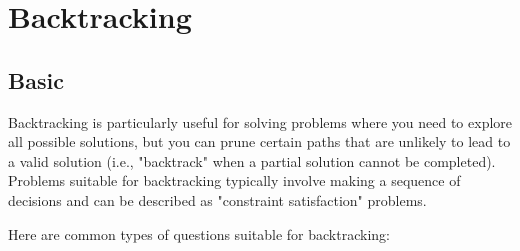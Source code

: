 \documentclass[a4paper,11pt,twoside]{book}
\begin{document}
\section{Backtracking}
\subsection{Basic}

	Backtracking is particularly useful for solving problems where you need to explore all possible solutions, but you can prune certain paths that are unlikely to lead to a valid solution (i.e., "backtrack" when a partial solution cannot be completed). Problems suitable for backtracking typically involve making a sequence of decisions and can be described as "constraint satisfaction" problems.

\par Here are common types of questions suitable for backtracking:
\end{document}
